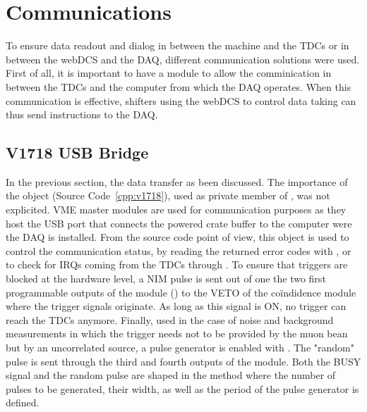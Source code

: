 \section{Communications}
\label{app1:sec:Comm}

	To ensure data readout and dialog in between the machine and the TDCs or in between the webDCS and the DAQ, different communication solutions were used. First of all, it is important to have a module to allow the comminication in between the TDCs and the computer from which the DAQ operates. When this communication is effective, shifters using the webDCS to control data taking can thus send instructions to the DAQ.\\

    \subsection{V1718 USB Bridge}
    \label{app1:ssec:V1718}
    
    In the previous section, the data transfer as been discussed. The importance of the  object (Source Code~\ref{cpp:v1718}), used as private member of , was not explicited. VME  master modules are used for communication purposes as they host the USB port that connects the powered crate buffer to the computer were the DAQ is installed. From the source code point of view, this object is used to control the communication status, by reading the returned error codes with , or to check for IRQs coming from the TDCs through . To ensure that triggers are blocked at the hardware level, a NIM pulse is sent out of one the two first programmable outputs of the module () to the VETO of the coïndidence module where the trigger signals originate. As long as this signal is ON, no trigger can reach the TDCs anymore. Finally, used in the case of noise and background measurements in which the trigger needs not to be provided by the muon bean but by an uncorrelated source, a pulse generator is enabled with . The "random" pulse is sent through the third and fourth outputs of the module. Both the BUSY signal and the random pulse are shaped in the method  where the number of pulses to be generated, their width, as well as the period of the pulse generator is defined.\\
	
